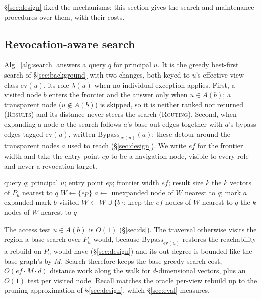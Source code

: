 \documentclass[sigconf, nonacm, review]{acmart}
\newcommand{\Nout}{N_{\mathrm{out}}}
\begin{document}
\S\ref{sec:design} fixed the mechanisms; this section gives the search
and maintenance procedures over them, with their costs.

\subsection{Revocation-aware search}

Alg.~\ref{alg:search} answers a query $q$ for principal $u$. It is the
greedy best-first search of \S\ref{sec:background} with two changes,
both keyed to $u$'s effective-view class $\mathrm{ev}(u)$, its role $\lambda(u)$ when no individual exception applies. First, a visited node $b$ enters the
frontier and the answer only when $u\in A(b)$; a transparent node
($u\notin A(b)$) is skipped, so it is neither ranked nor returned
(\textsc{Results}) and its distance never steers the search
(\textsc{Routing}). Second, when expanding a node $a$ the search follows
$a$'s base out-edges together with $a$'s bypass edges tagged $\mathrm{ev}(u)$,
written $\mathrm{Bypass}_{\mathrm{ev}(u)}(a)$; these detour around the
transparent nodes $a$ used to reach (\S\ref{sec:design}). We write
$\mathit{ef}$ for the frontier width and take the entry point $\mathit{ep}$ to be a
navigation node, visible to every role and never a revocation target.

\begin{algorithm}
\caption{Revocation-aware search}
\label{alg:search}
\begin{algorithmic}[1]
\Require query $q$; principal $u$; entry point $\mathit{ep}$; frontier width $\mathit{ef}$; result size $k$
\Ensure the $k$ vectors of $P_u$ nearest to $q$
\State $W \gets \{\mathit{ep}\}$ 
  \State $a \gets$ unexpanded node of $W$ nearest to $q$; mark $a$ expanded
  \For{each $b \in \Nout(a)\cup \mathrm{Bypass}_{\mathrm{ev}(u)}(a)$}
      \State mark $b$ visited
       
        \State $W \gets W \cup \{b\}$; keep the $\mathit{ef}$ nodes of $W$ nearest to $q$
      \EndIf
    \EndIf
  \EndFor
\EndWhile
\State \Return the $k$ nodes of $W$ nearest to $q$
\end{algorithmic}
\end{algorithm}

The access test $u\in A(b)$ is $O(1)$ (\S\ref{sec:ds}). The traversal
otherwise visits the region a base search over $P_u$ would, because
$\mathrm{Bypass}_{\mathrm{ev}(u)}$ restores the reachability a rebuild on
$P_u$ would have (\S\ref{sec:design}) and its out-degree is bounded
like the base graph's by $M$. Search therefore keeps
the base greedy-search cost, $O(\mathit{ef}\cdot M\cdot d)$ distance work
along the walk for $d$-dimensional vectors, plus an $O(1)$ test per visited
node. Recall matches the oracle per-view rebuild up to the pruning approximation of
\S\ref{sec:design}, which \S\ref{sec:eval} measures.
\end{document}
